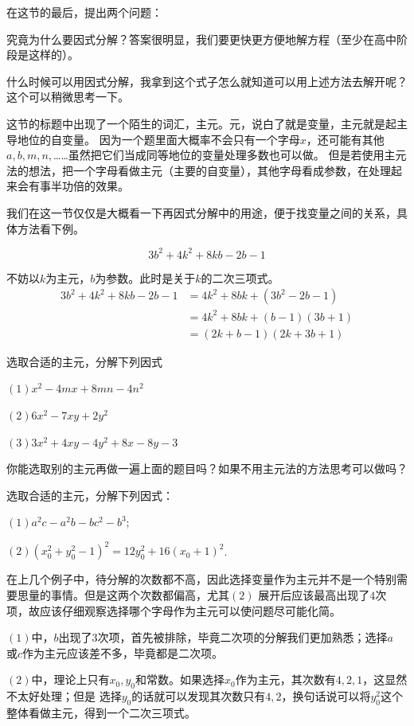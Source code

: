 在这节的最后，提出两个问题：

究竟为什么要因式分解？答案很明显，我们要更快更方便地解方程（至少在高中阶段是这样的）。

什么时候可以用因式分解，我拿到这个式子怎么就知道可以用上述方法去解开呢？这个可以稍微思考一下。

这节的标题中出现了一个陌生的词汇，主元。元，说白了就是变量，主元就是起主导地位的自变量。
因为一个题里面大概率不会只有一个字母$x$，还可能有其他$a,b,m,n,$……虽然把它们当成同等地位的变量处理多数也可以做。
但是若使用主元法的想法，把一个字母看做主元（主要的自变量），其他字母看成参数，在处理起来会有事半功倍的效果。

我们在这一节仅仅是大概看一下再因式分解中的用途，便于找变量之间的关系，具体方法看下例。
\begin{example}
\[3b^2+4k^2+8kb-2b-1\]
\end{example}
\begin{jie}
不妨以$k$为主元，$b$为参数。此时是关于\(k\)的二次三项式。 
\begin{align*}
    3b^2+4k^2+8kb-2b-1&=4k^2+8bk+(3b^2-2b-1)
\\                    &=4k^2+8bk+(b-1)(3b+1)
\\                    &=(2k+b-1)(2k+3b+1)
\end{align*}
\end{jie}
\begin{exercise}\label{exer:exercise 1.2.1}
    选取合适的主元，分解下列因式
    
$(1)x^2-4mx+8mn-4n^2$

$(2)6x^2-7xy+2y^2$

$(3)3x^2+4xy-4y^2+8x-8y-3$
\end{exercise}
\begin{zhu}
你能选取别的主元再做一遍上面的题目吗？如果不用主元法的方法思考可以做吗？
\end{zhu}
\begin{example}选取合适的主元，分解下列因式：

    \((1)a^2c-a^2b-bc^2-b^3\);

    \((2)(x_0^2+y_0^2-1)^2=12y_0^2+16(x_0+1)^2\).
\end{example}
\begin{analyse}
    在上几个例子中，待分解的次数都不高，因此选择变量作为主元并不是一个特别需要思量的事情。但是这两个次数都偏高，尤其$(2)$
    展开后应该最高出现了$4$次项，故应该仔细观察选择哪个字母作为主元可以使问题尽可能化简。

    \((1)\)中，\(b\)出现了\(3\)次项，首先被排除，毕竟二次项的分解我们更加熟悉；选择\(a\)
    或\(c\)作为主元应该差不多，毕竟都是二次项。

    \((2)\)中，理论上只有\(x_0,y_0\)和常数。如果选择\(x_0\)作为主元，其次数有\(4,2,1\)，这显然不太好处理；但是
    选择\(y_0\)的话就可以发现其次数只有\(4,2\)，换句话说可以将\(y_0^2\)这个整体看做主元，得到一个二次三项式。
\end{analyse}
